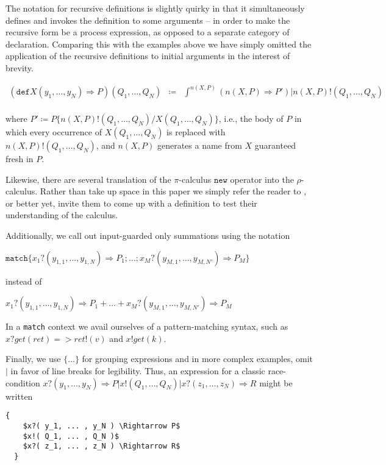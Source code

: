 \documentclass[]{amsart}
\newcommand{\id}[1]{\texttt{#1}}
\newcommand{\juxtap}{\mathbin{\id{|}}}
\newcommand{\binpar}[2]{#1 \juxtap #2}
\newcommand{\bangxp}[2]{\int^{#2} #1}
\newcommand{\defneqls}{\coloneqq}
\theoremstyle{definition}
\theoremstyle{remark}
\numberwithin{equation}{subsection}
\newcommand{\pic}{$\pi$-calculus}
\newcommand{\rhoc}{$\rho$-calculus}
\begin{document}
The notation for recursive definitions is slightly quirky in that it
simultaneously defines and invokes the definition to some arguments --
in order to make the recursive form be a process expression, as
opposed to a separate category of declaration. Comparing this with the
examples above we have simply omitted the application of the recursive
definitions to initial arguments in the interest of brevity.

\begin{eqnarray*}
  (\texttt{def} {X}{( y_1, \ldots, y_N )} \Rightarrow {P}){( Q_1, \ldots, Q_N )} & \defneqls & \binpar{\bangxp{(n( X, P ) \Rightarrow P')}{n( X, P )}}{n( X, P )!( Q_1, \ldots, Q_N )} \\  
\end{eqnarray*}

where $P' \defneqls P \{ n( X, P )!( Q_1, \ldots, Q_N )/ X( Q_1,
\ldots, Q_N )\}$, i.e., the body of $P$ in which every occurrence of
$X( Q_1, \ldots, Q_N )$ is replaced with $n( X, P )!( Q_1, \ldots, Q_N
)$, and $n( X, P )$ generates a name from $X$ guaranteed fresh in $P$.

Likewise, there are several translation of the \pic\; $\texttt{new}$
operator into the \rhoc. Rather than take up space in this paper we
simply refer the reader to \cite{DBLP:journals/entcs/MeredithR05}, or
better yet, invite them to come up with a definition to test their
understanding of the calculus.

Additionally, we call out input-guarded only summations using the notation

$\texttt{match}\{ x_1?( y_{1,1}, \ldots, y_{1,N} ) \Rightarrow P_1 ; \ldots ; x_M?(y_{M,1}, \ldots, y_{M,N'} ) \Rightarrow P_M \}$ 

\noindent instead of 

$x_1?( y_{1,1}, \ldots, y_{1,N} ) \Rightarrow P_1 + \ldots + x_M?( y_{M,1},\ldots, y_{M,N'} ) \Rightarrow P_M$

In a \texttt{match} context we avail ourselves of a pattern-matching
syntax, such as $x ? get( ret ) => ret!( v )$ and $x ! get( k )$.

Finally, we use $\{ \ldots \}$ for grouping expressions and in more complex examples, omit
$\binpar{}{}$ in favor of line breaks for legibility. Thus, an expression for a classic race-condition $\binpar{ x?( y_1, \ldots, y_N ) \Rightarrow P}{\binpar{x!( Q_1, \ldots, Q_N )}{ x?( z_1, \ldots, z_N ) \Rightarrow R}}$ might be written
\begin{lstlisting}[mathescape]
  {
    $x?( y_1, ... , y_N ) \Rightarrow P$
    $x!( Q_1, ... , Q_N )$
    $x?( z_1, ... , z_N ) \Rightarrow R$
  }
\end{lstlisting}
\end{document}

